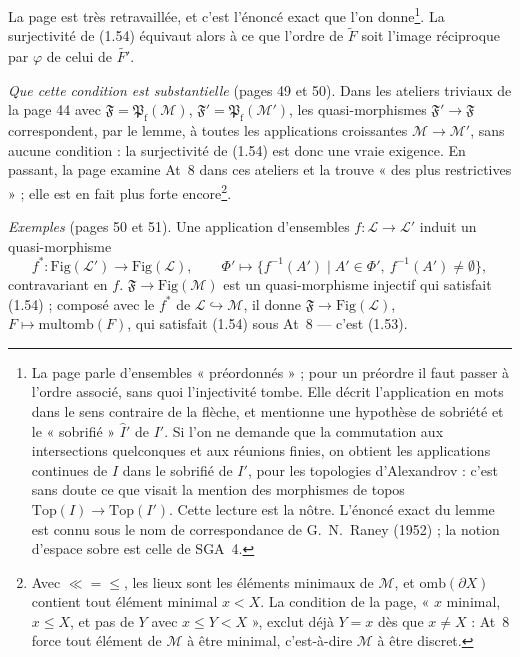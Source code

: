 \documentclass[11pt,a4paper]{article}
\begin{document}
La page est très retravaillée, et c'est l'énoncé exact que l'on
donne\footnote{La page parle d'ensembles « préordonnés » ; pour un préordre il
faut passer à l'ordre associé, sans quoi l'injectivité tombe. Elle décrit
l'application en mots dans le sens contraire de la flèche, et mentionne une
hypothèse de sobriété et le « sobrifié » $\widehat{I}'$ de $I'$. Si l'on ne
demande que la commutation aux intersections quelconques et aux réunions finies,
on obtient les applications continues de $I$ dans le sobrifié de $I'$, pour les
topologies d'Alexandrov : c'est sans doute ce que visait la mention des
morphismes de topos $\mathrm{Top}(I) \to \mathrm{Top}(I')$. Cette lecture est la
nôtre. L'énoncé exact du lemme est connu sous le nom de correspondance de
G.~N.~Raney (1952) ; la notion d'espace sobre est celle de SGA~4.}. La surjectivité
de (1.54) équivaut alors à ce que l'ordre de $\widetilde{F}$ soit l'image
réciproque par $\varphi$ de celui de $\widetilde{F'}$.

\emph{Que cette condition est substantielle} (pages 49 et 50). Dans les ateliers
triviaux de la page 44 avec $\mathfrak{F} = \mathfrak{P}_{\mathrm{f}}(\mathcal{M})$,
$\mathfrak{F}' = \mathfrak{P}_{\mathrm{f}}(\mathcal{M}')$, les quasi-morphismes
$\mathfrak{F}' \to \mathfrak{F}$ correspondent, par le lemme, à toutes les
applications croissantes $\mathcal{M} \to \mathcal{M}'$, sans aucune condition :
la surjectivité de (1.54) est donc une vraie exigence. En passant, la page
examine At~8 dans ces ateliers et la trouve « des plus restrictives » ; elle est
en fait plus forte encore\footnote{Avec $\ll = \leq$, les lieux sont les
éléments minimaux de $\mathcal{M}$, et $\mathrm{omb}(\partial X)$ contient tout
élément minimal $x < X$. La condition de la page, « $x$ minimal, $x \leq X$, et
pas de $Y$ avec $x \leq Y < X$ », exclut déjà $Y = x$ dès que $x \neq X$ : At~8
force tout élément de $\mathcal{M}$ à être minimal, c'est-à-dire $\mathcal{M}$ à
être discret.}.

\emph{Exemples} (pages 50 et 51). Une application d'ensembles $f : \mathcal{L}
\to \mathcal{L}'$ induit un quasi-morphisme
\[
f^{*} : \mathrm{Fig}(\mathcal{L}') \longrightarrow \mathrm{Fig}(\mathcal{L}),
\qquad \Phi' \longmapsto \lbrace f^{-1}(A') \mid A' \in \Phi',\ f^{-1}(A') \neq
\emptyset \rbrace ,
\]
contravariant en $f$. $\mathfrak{F} \to \mathrm{Fig}(\mathcal{M})$ est un
quasi-morphisme injectif qui satisfait (1.54) ; composé avec le $f^{*}$ de
$\mathcal{L} \hookrightarrow \mathcal{M}$, il donne $\mathfrak{F} \to
\mathrm{Fig}(\mathcal{L})$, $F \mapsto \mathrm{multomb}(F)$, qui satisfait (1.54)
sous At~8 --- c'est (1.53).
\end{document}
